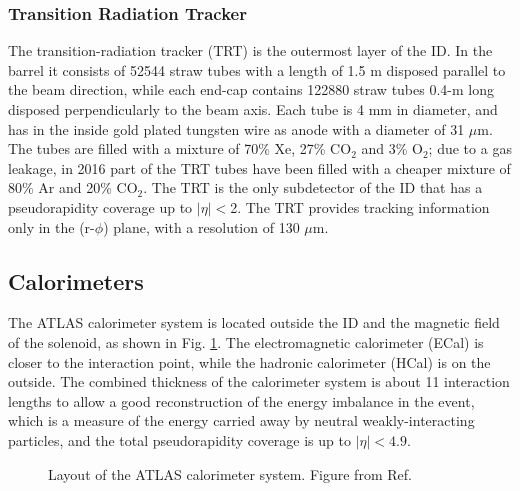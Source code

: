 \subsubsection*{Transition Radiation Tracker}

The transition-radiation tracker (TRT) is the outermost layer of the ID. In the barrel it consists of 52544 straw tubes with a length of 1.5 m disposed parallel to the beam direction, while each end-cap contains 122880 straw tubes 0.4-m long disposed perpendicularly to the beam axis. Each tube is 4 mm in diameter, and has in the inside gold plated tungsten wire as anode with a diameter of 31 $\mu$m. The tubes are filled with a mixture of 70\% Xe, 27\% CO$_2$ and 3\% O$_2$; due to a gas leakage, in 2016 part of the TRT tubes have been filled with a cheaper mixture of 80\% Ar and 20\% CO$_2$. The TRT is the only subdetector of the ID that has a pseudorapidity coverage up to $|\eta|<$2. The TRT provides tracking information only in the (r-$\phi$) plane, with a resolution of 130 $\mu$m.


\subsection{Calorimeters}

The ATLAS calorimeter system is located outside the ID and the magnetic field of the solenoid, as shown in Fig. \ref{fig:atlas:calo}. The electromagnetic calorimeter (ECal) is closer to the interaction point, while the hadronic calorimeter (HCal) is on the outside. 
The combined thickness of the calorimeter system is about 11 interaction lengths to allow a good reconstruction of the energy imbalance in the event, which is a measure of the energy carried away by neutral weakly-interacting particles, and the total pseudorapidity coverage is up to $|\eta|<4.9$.

\begin{figure}[ht]
\centering
{}
\caption{Layout of the ATLAS calorimeter system. Figure from Ref. \cite{atlas:atlas}}
\label{fig:atlas:calo}
\end{figure}


